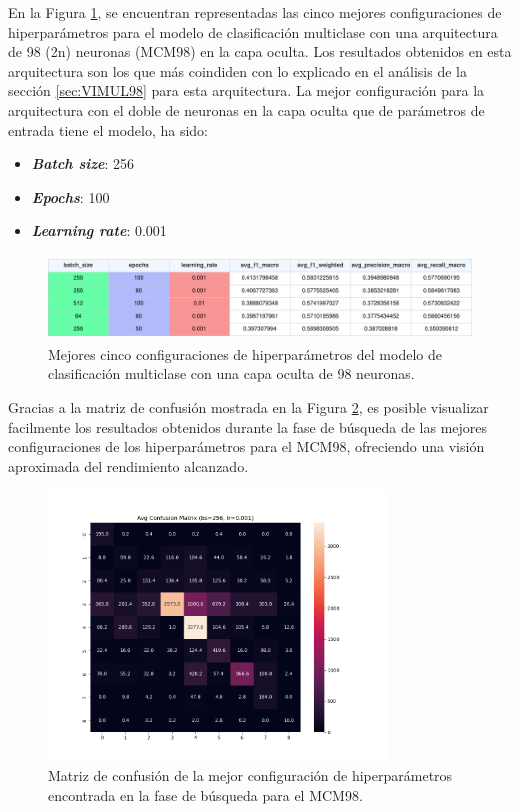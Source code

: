 En la Figura \ref{fig:MULhs98}, se encuentran representadas las cinco mejores configuraciones de hiperparámetros para el modelo de clasificación multiclase con una arquitectura de 98 (2n) neuronas (MCM98) en la capa oculta. Los resultados obtenidos en esta arquitectura son los que más coindiden con lo explicado en el análisis de la sección \ref{sec:VIMUL98} para esta arquitectura. La mejor configuración para la arquitectura con el doble de neuronas en la capa oculta que de parámetros de entrada tiene el modelo, ha sido:
\begin{itemize}
	\item \textbf{\textit{Batch size}}: 256
	\item \textbf{\textit{Epochs}}: 100
	\item \textbf{\textit{Learning rate}}: 0.001
\end{itemize}

\begin{figure}[H]
    \centering
    \includegraphics[width=1\textwidth]{./img/modelo/resultados/MULhs98.pdf}
    \caption{Mejores cinco configuraciones de hiperparámetros del modelo de clasificación multiclase con una capa oculta de 98 neuronas.}
    \label{fig:MULhs98}
\end{figure}

Gracias a la matriz de confusión mostrada en la Figura \ref{fig:MC_ENT_MCM98}, es posible visualizar facilmente los resultados obtenidos durante la fase de búsqueda de las mejores configuraciones de los hiperparámetros para el MCM98, ofreciendo una visión aproximada del rendimiento alcanzado.

\begin{figure}[H]
    \centering
    \includegraphics[width=0.8\textwidth]{./img/modelo/matrices_confusion/MC_ENT_MCM98.png}
    \caption{Matriz de confusión de la mejor configuración de hiperparámetros encontrada en la fase de búsqueda para el MCM98.}
    \label{fig:MC_ENT_MCM98}
\end{figure}


